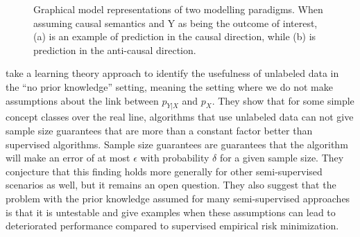 \documentclass[twoside]{memoir}\usepackage[]{graphicx}\usepackage{xcolor}
\begin{document}
\begin{figure}
\centering
{}%
\quad\quad\quad
{}
\caption{Graphical model representations of two modelling paradigms. When assuming causal semantics and Y as being the outcome of interest,  (a) is an example of prediction in the causal direction, while (b) is prediction in the anti-causal direction.}
\label{fig:graphicalmodel}
\end{figure}

\citet{Ben-David2008} take a learning theory approach to identify the usefulness of unlabeled data in the ``no prior knowledge'' setting, meaning the setting where we do not make assumptions about the link between $p_{Y|X}$ and $p_{X}$. They show that for some simple concept classes over the real line, algorithms that use unlabeled data can not give sample size guarantees that are more than a constant factor better than supervised algorithms. Sample size guarantees are guarantees that the algorithm will make an error of at most $\epsilon$ with probability $\delta$ for a given sample size. They conjecture that this finding holds more generally for other semi-supervised scenarios as well, but it remains an open question. They also suggest that the problem with the prior knowledge assumed for many semi-supervised approaches is that it is untestable and give examples when these assumptions can lead to deteriorated performance compared to supervised empirical risk minimization.
\end{document}
